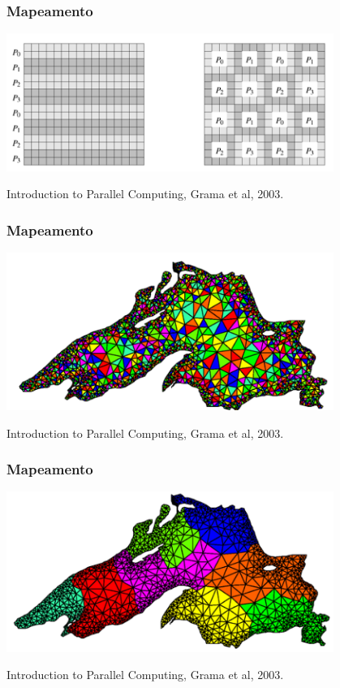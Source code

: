\documentclass[xcolor={usenames,dvipsnames},12pt,presentation,aspectratio=169]{beamer}
\begin{document}
\begin{frame}
  \frametitle{Mapeamento}
  \vspace{-4mm}
  \begin{center}
	\includegraphics[width=0.8\textwidth]{map4.png}
  \end{center}
  \vfill
  {\tiny Introduction to Parallel Computing, Grama et al, 2003.}
\end{frame}
\begin{frame}
  \frametitle{Mapeamento}
  \vspace{-4mm}
  \begin{center}
	\includegraphics[width=0.8\textwidth]{map5.png}
  \end{center}
  \vfill
  {\tiny Introduction to Parallel Computing, Grama et al, 2003.}
\end{frame}
\begin{frame}
  \frametitle{Mapeamento}
  \vspace{-4mm}
  \begin{center}
	\includegraphics[width=0.8\textwidth]{map6.png}
  \end{center}
  \vfill
  {\tiny Introduction to Parallel Computing, Grama et al, 2003.}
\end{frame}
\end{document}
